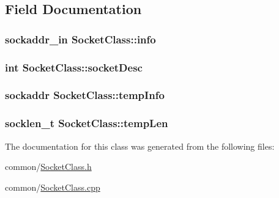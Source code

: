 \subsection{\-Field \-Documentation}
\hypertarget{classSocketClass_a81f6c01eeabff07e468097f69c6efb9b}{
\subsubsection[{info}]{\setlength{\rightskip}{0pt plus 5cm}sockaddr\-\_\-in {\bf \-Socket\-Class\-::info}}}\label{classSocketClass_a81f6c01eeabff07e468097f69c6efb9b}
\hypertarget{classSocketClass_a77c5d4d941abeb445665e2bce2fc48be}{
\subsubsection[{socket\-Desc}]{\setlength{\rightskip}{0pt plus 5cm}int {\bf \-Socket\-Class\-::socket\-Desc}}}\label{classSocketClass_a77c5d4d941abeb445665e2bce2fc48be}
\hypertarget{classSocketClass_a237dc3679dcac98a044b8eb31a6a3cf8}{
\subsubsection[{temp\-Info}]{\setlength{\rightskip}{0pt plus 5cm}sockaddr {\bf \-Socket\-Class\-::temp\-Info}}}\label{classSocketClass_a237dc3679dcac98a044b8eb31a6a3cf8}
\hypertarget{classSocketClass_ab9712fd21de1ff87b027ddbbcf1ebd5a}{
\subsubsection[{temp\-Len}]{\setlength{\rightskip}{0pt plus 5cm}socklen\-\_\-t {\bf \-Socket\-Class\-::temp\-Len}}}\label{classSocketClass_ab9712fd21de1ff87b027ddbbcf1ebd5a}


\-The documentation for this class was generated from the following files\-:\begin{DoxyCompactItemize}
\item 
common/\hyperlink{SocketClass_8h}{\-Socket\-Class.\-h}\item 
common/\hyperlink{SocketClass_8cpp}{\-Socket\-Class.\-cpp}\end{DoxyCompactItemize}
